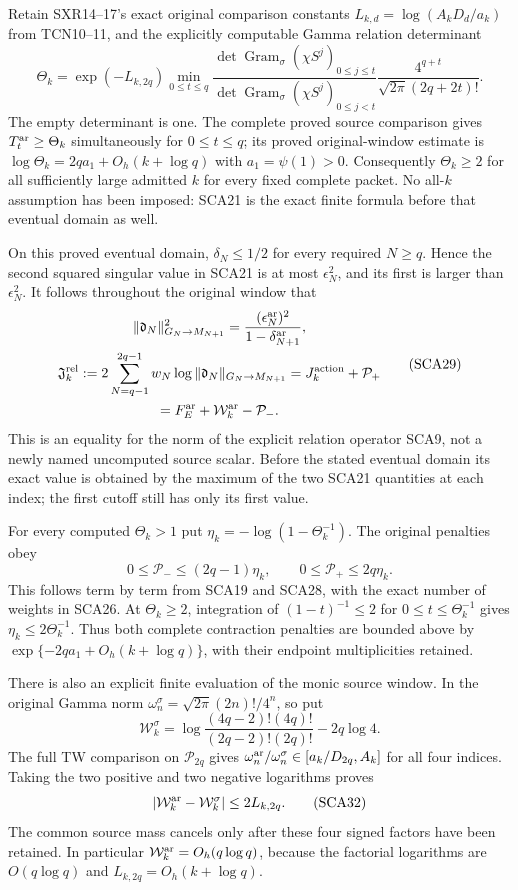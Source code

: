 Retain SXR14--17's exact original comparison constants
$L_{k,d}=\log(A_kD_d/a_k)$ from TCN10--11, and the explicitly computable
Gamma relation determinant
\[
 \Theta_k=\exp(-L_{k,2q})\min_{0\le t\le q}
 \frac{\det\operatorname{Gram}_\sigma(\chi S^j)_{0\le j\le t}}
      {\det\operatorname{Gram}_\sigma(\chi S^j)_{0\le j<t}}
 \frac{4^{q+t}}{\sqrt{2\pi}(2q+2t)!}.
 \tag{SCA28}
\]
The empty determinant is one. The complete proved source comparison gives
$T_t^{\rm ar}\ge\Theta_k$ simultaneously for $0\le t\le q$; its proved
original-window estimate is
$\log\Theta_k=2qa_1+O_h(k+\log q)$ with $a_1=\psi(1)>0$.
Consequently $\Theta_k\ge2$ for all sufficiently large admitted $k$ for
every fixed complete packet. No all-$k$ assumption has been imposed: SCA21
is the exact finite formula before that eventual domain as well.

On this proved eventual domain, $\delta_N\le1/2$ for every required
$N\ge q$. Hence the second squared singular value in SCA21 is at most
$\epsilon_N^2$, and its first is larger than $\epsilon_N^2$.
It follows throughout the original window that
\[
 \begin{gathered}
 \|\mathfrak d_N\|_{G_N\to M_{N+1}}^2
             =\frac{(\epsilon_N^{\rm ar})^2}{1-\delta_{N+1}^{\rm ar}},\\
 \mathfrak J_k^{\rm rel}:=
      2\sum_{N=q-1}^{2q-1}w_N\log
                  \|\mathfrak d_N\|_{G_N\to M_{N+1}}
       =J_k^{\rm action}+\mathcal P_+\\
       =F_E^{\rm ar}+\mathcal W_k^{\rm ar}-\mathcal P_-.
 \end{gathered}\tag{SCA29}
\]
This is an equality for the norm of the explicit relation operator SCA9,
not a newly named uncomputed source scalar. Before the stated eventual
domain its exact value is obtained by the maximum of the two SCA21
quantities at each index; the first cutoff still has only its first value.

For every computed $\Theta_k>1$ put
$\eta_k=-\log(1-\Theta_k^{-1})$. The original penalties obey
\[
 0\le\mathcal P_-\le(2q-1)\eta_k,\qquad
 0\le\mathcal P_+\le2q\eta_k.
 \tag{SCA30}
\]
This follows term by term from SCA19 and SCA28, with the exact number of
weights in SCA26. At $\Theta_k\ge2$, integration of $(1-t)^{-1}\le2$
for $0\le t\le\Theta_k^{-1}$ gives $\eta_k\le2\Theta_k^{-1}$.
Thus both complete contraction penalties are bounded above by
$\exp\{-2qa_1+O_h(k+\log q)\}$, with their endpoint multiplicities retained.

There is also an explicit finite evaluation of the monic source window.
In the original Gamma norm $\omega_n^\sigma=\sqrt{2\pi}(2n)!/4^n$,
so put
\[
 \mathcal W_k^\sigma
 =\log\frac{(4q-2)!(4q)!}{(2q-2)!(2q)!}-2q\log4.
 \tag{SCA31}
\]
The full TW comparison on $\mathcal P_{2q}$ gives
$\omega_n^{\rm ar}/\omega_n^\sigma\in[a_k/D_{2q},A_k]$ for all
four indices. Taking the two positive and two negative logarithms proves
\[
 |\mathcal W_k^{\rm ar}-\mathcal W_k^\sigma|\le2L_{k,2q}.
 \tag{SCA32}
\]
The common source mass cancels only after these four signed factors have
been retained. In particular $\mathcal W_k^{\rm ar}=O_h(q\log q)$,
because the factorial logarithms are $O(q\log q)$ and
$L_{k,2q}=O_h(k+\log q)$.

